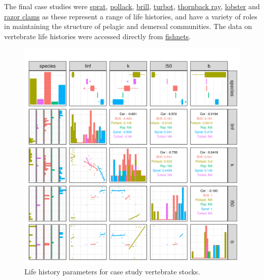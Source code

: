  
The final case studies were 
\href{https://3o2y9wugzp1kfxr5hvzgzq-on.drv.tw/MyDas/tasks/2/sprat.html}{sprat}, 
\href{https://3o2y9wugzp1kfxr5hvzgzq-on.drv.tw/MyDas/tasks/2/pollack.html}{pollack}, 
\href{https://3o2y9wugzp1kfxr5hvzgzq-on.drv.tw/MyDas/tasks/2/brill.html}{brill}, 
\href{https://3o2y9wugzp1kfxr5hvzgzq-on.drv.tw/MyDas/tasks/2/turbot.html}{turbot}, 
\href{https://3o2y9wugzp1kfxr5hvzgzq-on.drv.tw/MyDas/tasks/2/ray.html}{thornback ray}, 
\href{https://3o2y9wugzp1kfxr5hvzgzq-on.drv.tw/MyDas/tasks/2/lobster.html}{lobster} and 
\href{https://3o2y9wugzp1kfxr5hvzgzq-on.drv.tw/MyDas/tasks/2/razor.html}{razor clams} as these represent a range of life histories, and have a variety of roles in maintaining the structure of pelagic and demersal communities. The data on vertebrate life histories were accessed directly from \href{https://3o2y9wugzp1kfxr5hvzgzq-on.drv.tw/MyDas/tasks/1/stocks.html}{fishnets}. 

\begin{figure}[h!]\centering\includegraphics[width=6in]{figs/1-pairwise-1.png}\caption{Life history parameters for case study vertebrate stocks.}\label{fig:stocks}
\end{figure}

